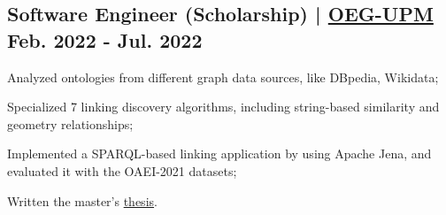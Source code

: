 \subsection{{Software Engineer (Scholarship) | \href{https://oeg.fi.upm.es}{OEG-UPM} \hfill Feb. 2022 - Jul. 2022}}
\begin{zitemize}
    \item  Analyzed ontologies from different graph data sources, like DBpedia, Wikidata;
    \item  Specialized 7 linking discovery algorithms, including string-based similarity and geometry relationships;
    \item  Implemented a SPARQL-based linking application by using Apache Jena, and evaluated it with the OAEI-2021 datasets;
    \item  Written the master's \href{https://oa.upm.es/71452/}{thesis}.
\end{zitemize}

